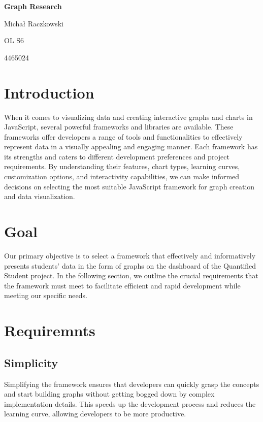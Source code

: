 \documentclass[a4paper, 11pt]{article}
\begin{document}
\begin{titlepage}
	\setlength{\parindent}{0pt}
	\vspace*{.15\textheight}
	\medbreak
	{\Huge\bfseries\color{MSBlue} Graph Research\par}
	\bigbreak
    \bigbreak
	{Michał Raczkowski\par}
    \smallbreak
    {\small OL S6\par}
    \smallbreak
    {\small 4465024\par}
\end{titlepage}

\pagebreak

\tableofcontents

\pagebreak


\section{Introduction}
When it comes to visualizing data and creating interactive graphs and charts in JavaScript, several powerful frameworks and libraries are available. These frameworks offer developers a range of tools and functionalities to effectively represent data in a visually appealing and engaging manner. 
Each framework has its strengths and caters to different development preferences and project requirements. By understanding their features, chart types, learning curves, customization options, and interactivity capabilities, we can make informed decisions on selecting the most suitable JavaScript framework for graph creation and data visualization.

\section{Goal}
Our primary objective is to select a framework that effectively and informatively presents students' data in the form of graphs on the dashboard of the Quantified Student project. In the following section, we outline the crucial requirements that the framework must meet to facilitate efficient and rapid development while meeting our specific needs.

\section{Requiremnts}
    \subsection{Simplicity}
    Simplifying the framework ensures that developers can quickly grasp the concepts and start building graphs without getting bogged down by complex implementation details. This speeds up the development process and reduces the learning curve, allowing developers to be more productive.
\end{document}
